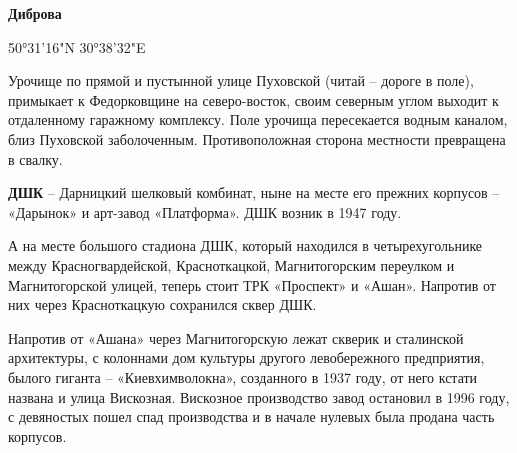 \medskip


\textbf{Диброва}

50°31'16"N 30°38'32"E 

Урочище по прямой и пустынной улице Пуховской (читай – дороге в поле), примыкает к Федорковщине на северо-восток, своим северным углом выходит к отдаленному гаражному комплексу. Поле урочища пересекается водным каналом, близ Пуховской заболоченным. Противоположная сторона местности превращена в свалку.\\

\medskip


\textbf{ДШК} – Дарницкий шелковый комбинат, ныне на месте его прежних корпусов – «Дарынок» и арт-завод «Платформа». ДШК возник в 1947 году.

А на месте большого стадиона ДШК, который находился в четырехугольнике между Красногвардейской, Красноткацкой, Магнитогорским переулком и Магнитогорской улицей, теперь стоит ТРК «Проспект» и «Ашан». Напротив от них через Красноткацкую сохранился сквер ДШК. 

Напротив от «Ашана» через Магнитогорскую лежат скверик и сталинской архитектуры, с колоннами дом культуры другого левобережного предприятия, былого гиганта – «Киевхимволокна», созданного в 1937 году, от него кстати названа и улица Вискозная. Вискозное производство завод остановил в 1996 году, с девяностых пошел спад производства и в начале нулевых была продана часть корпусов.